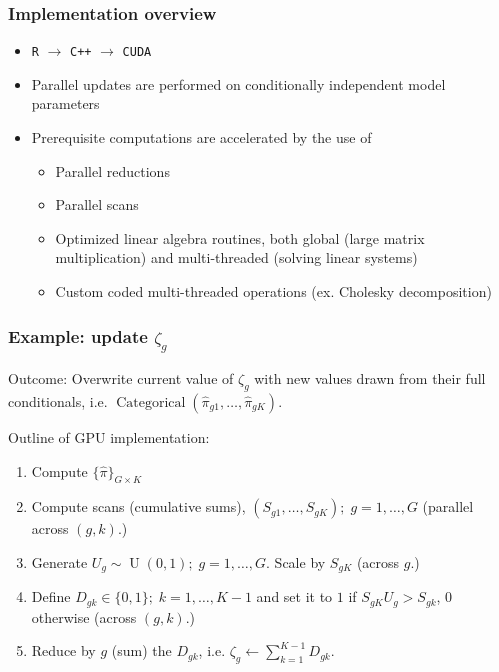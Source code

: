 \documentclass{beamer}
\newcommand{\op}{\operatorname}
\begin{document}
\begin{frame}%
  \frametitle{Implementation overview}
  \begin{itemize}
    \item   \texttt{R} $\rightarrow$ \texttt{C++} $\rightarrow$ \texttt{CUDA}
    \item Parallel updates are performed on conditionally independent model parameters
    \item Prerequisite computations are accelerated by the use of
    \begin{itemize}
      \item Parallel reductions
      \item Parallel scans
      \item Optimized linear algebra routines, both global (large matrix multiplication) and multi-threaded (solving linear systems)
      \item Custom coded multi-threaded operations (ex. Cholesky decomposition)
    \end{itemize}
  \end{itemize}
\end{frame}

\begin{frame}%
  \frametitle{Example: update $\zeta_g$}
  Outcome: Overwrite current value of $\zeta_g$ with new values drawn from their full conditionals, i.e. $\op{Categorical}(\hat{\pi}_{g1},\ldots,\hat{\pi}_{gK})$.

  \vspace{.7cm}
  Outline of GPU implementation:
  \small
  \begin{enumerate}
    \item Compute $\{\hat{\pi}\}_{G\times K}$
    \pause\item Compute scans (cumulative sums), $(S_{g1},\ldots,S_{gK});\;g=1,\ldots,G$ (parallel across $(g,k)$.)
    \pause\item Generate $U_g \sim \op{U}(0,1);\;g=1,\ldots,G$. Scale by $S_{gK}$ (across $g$.)
    \pause\item Define $D_{gk} \in \{0,1\};\;k=1,\ldots,K-1$ and set it to $1$ if $S_{gK}U_g > S_{gk}$, $0$ otherwise (across $(g,k)$.)
    \pause\item Reduce by $g$ (sum) the $D_{gk}$, i.e. $\zeta_g \leftarrow \sum_{k=1}^{K-1} D_{gk}$.
  \end{enumerate}
\end{frame}
\end{document}
